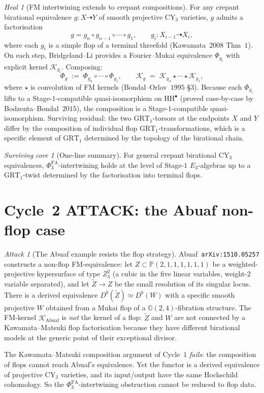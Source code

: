 \documentclass[11pt]{article}
\theoremstyle{definition}
\theoremstyle{remark}
\newtheorem{attack}[theorem]{Attack}
\newtheorem{heal}[theorem]{Heal}
\newtheorem{survivor}[theorem]{Surviving core}
\providecommand{\PhiFA}{\Phi^{\mathrm{FA}}}
\providecommand{\cK}{\mathcal{K}}
\providecommand{\HH}{\mathrm{HH}}
\providecommand{\PP}{\mathbb{P}}
\providecommand{\GRT}{\mathrm{GRT}}
\begin{document}
\begin{heal}[FM intertwining extends to crepant compositions]
\label{heal:a-cycle-1}
For any crepant birational equivalence $g \colon X \dashrightarrow Y$
of smooth projective CY$_3$ varieties, $g$ admits a factorisation
\[
 g = g_n \circ g_{n-1} \circ \cdots \circ g_1, \qquad
 g_i \colon X_{i-1} \dashrightarrow X_i,
\]
where each $g_i$ is a simple flop of a terminal threefold
(Kawamata~$2008$ Thm~$1$). On each step, Bridgeland--Li provides a
Fourier--Mukai equivalence $\Phi_{g_i}$ with explicit kernel
$\cK_{g_i}$. Composing:
\[
 \Phi_g \;:=\; \Phi_{g_n} \circ \cdots \circ \Phi_{g_1}, \qquad
 \cK_g \;=\; \cK_{g_n} \star \cdots \star \cK_{g_1},
\]
where $\star$ is convolution of FM kernels
(Bondal--Orlov~$1995$ \S $3$). Because each
$\Phi_{g_i}$ lifts to a Stage-$1$-compatible quasi-isomorphism on
$\HH^\bullet$ (proved case-by-case by Bodzenta--Bondal~$2015$), the
composition is a Stage-$1$-compatible quasi-isomorphism. Surviving
residual: the two $\GRT_1$-torsors at the endpoints $X$ and $Y$
differ by the composition of individual flop $\GRT_1$-transformations,
which is a specific element of $\GRT_1$ determined by the topology of
the birational chain.
\end{heal}

\begin{survivor}[One-line summary]
For general crepant birational CY$_3$ equivalences, $\PhiFA_3$-intertwining
holds at the level of Stage-$1$ $E_3$-algebras up to a $\GRT_1$-twist
determined by the factorisation into terminal flops.
\end{survivor}

\section{Cycle~2 ATTACK: the Abuaf non-flop case}

\begin{attack}[The Abuaf example resists the flop strategy]
\label{att:a-cycle-2}
Abuaf~\texttt{arXiv:1510.05257} constructs a non-flop FM-equivalence:
let $Z \subset \PP(2,1,1,1,1,1,1)$ be a weighted-projective hypersurface
of type $Z_3^{2}$ (a cubic in the five linear variables, weight-$2$
variable separated), and let $\widetilde Z \to Z$ be the small
resolution of its singular locus. There is a derived equivalence
$D^b(\widetilde Z) \simeq D^b(W)$ with a specific smooth projective
$W$ obtained from a Mukai flop of a $\mathbb G(2,4)$-fibration
structure. The FM-kernel $\cK_{\mathrm{Abuaf}}$ is \emph{not} the
kernel of a flop: $\widetilde Z$ and $W$ are not connected by a
Kawamata--Matsuki flop factorisation because they have different
birational models at the generic point of their exceptional divisor.

The Kawamata--Matsuki composition argument of Cycle~$1$ \emph{fails}:
the composition of flops cannot reach Abuaf's equivalence. Yet the
functor is a derived equivalence of projective CY$_3$ varieties, and
its input/output have the same Hochschild cohomology. So the
$\PhiFA_3$-intertwining obstruction cannot be reduced to flop data.
\end{attack}
\end{document}
